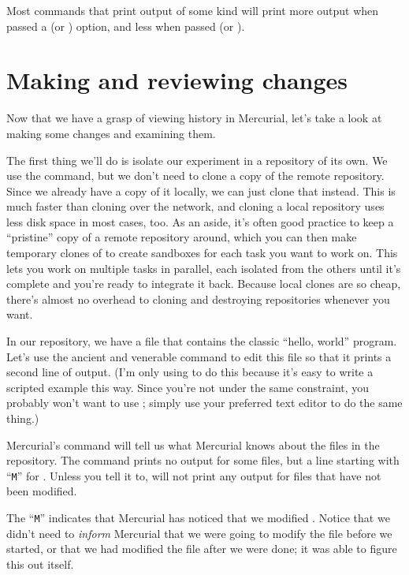 Most commands that print output of some kind will print more output
when passed a  (or ) option, and less
when passed  (or ).

\section{Making and reviewing changes}

Now that we have a grasp of viewing history in Mercurial, let's take a
look at making some changes and examining them.

The first thing we'll do is isolate our experiment in a repository of
its own.  We use the  command, but we don't need to
clone a copy of the remote repository.  Since we already have a copy
of it locally, we can just clone that instead.  This is much faster
than cloning over the network, and cloning a local repository uses
less disk space in most cases, too.
As an aside, it's often good practice to keep a ``pristine'' copy of a
remote repository around, which you can then make temporary clones of
to create sandboxes for each task you want to work on.  This lets you
work on multiple tasks in parallel, each isolated from the others
until it's complete and you're ready to integrate it back.  Because
local clones are so cheap, there's almost no overhead to cloning and
destroying repositories whenever you want.

In our  repository, we have a file
 that contains the classic ``hello, world'' program.
Let's use the ancient and venerable  command to edit this
file so that it prints a second line of output.  (I'm only using
 to do this because it's easy to write a scripted example
this way.  Since you're not under the same constraint, you probably
won't want to use ; simply use your preferred text editor to
do the same thing.)

Mercurial's  command will tell us what Mercurial knows
about the files in the repository.
The  command prints no output for some files, but a line
starting with ``\texttt{M}'' for .  Unless you tell
it to,  will not print any output for files that have
not been modified.  

The ``\texttt{M}'' indicates that Mercurial has noticed that we
modified .  Notice that we didn't need to
\emph{inform} Mercurial that we were going to modify the file before
we started, or that we had modified the file after we were done; it
was able to figure this out itself.

